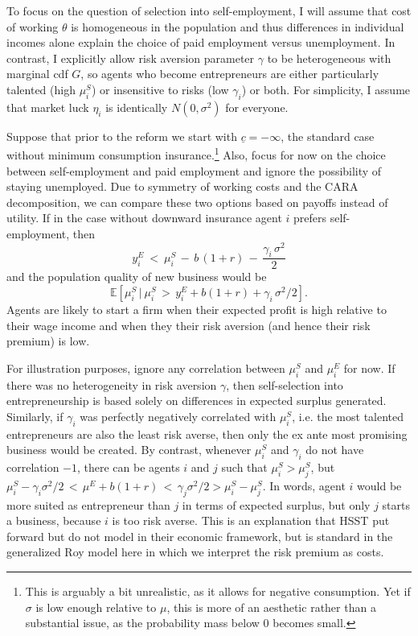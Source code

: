 \noindent To focus on the question of selection into self-employment, I will assume that  cost of working $\theta$ is homogeneous in the population and thus differences in individual incomes alone explain the choice of paid employment versus unemployment. In contrast, I explicitly allow risk aversion parameter $\gamma$ to be heterogeneous with marginal cdf $G$, so agents who become entrepreneurs are either particularly talented (high $\mu_i^S$) or insensitive to risks (low $\gamma_i$) or both. For simplicity, I assume that market luck $\eta_i$ is identically $N(0, \sigma^2)$ for everyone. \newline

\noindent Suppose that prior to the reform we start with $\underline{c} = - \infty$, the standard case without minimum consumption insurance.\footnote{This is arguably a bit unrealistic, as it allows for negative consumption. Yet if $\sigma$ is low enough relative to $\mu$, this is more of an aesthetic rather than a substantial issue, as the probability mass below $0$ becomes small.}
Also, focus for now on the choice between self-employment and paid employment and ignore the possibility of staying unemployed. Due to symmetry of working costs and the CARA decomposition, we can compare these two options based on payoffs instead of utility. If in the case without downward insurance agent $i$ prefers self-employment, then 
\begin{equation}
y^E_i \:  < \:  \mu^S_i \, - \,  b \, (1+r) \, - \, \frac{\gamma_i \, \sigma^2}{2}
\end{equation} 
and the population quality of new business would be 
\begin{equation}
\mathbb{E}\left[\mu_i^S \, | \: \mu_i^S \, > \, y_i^E + b(1+r) + \gamma_i \, \sigma^2 / 2\right].
\end{equation}
Agents are likely to start a firm when their expected profit is high relative to their wage income and when they their risk aversion (and hence their risk premium) is low. 

For illustration purposes, ignore any correlation between $\mu_i^S$ and $\mu_i^E$ for now. If there was no heterogeneity in risk aversion $\gamma$, then self-selection into entrepreneurship is based solely on differences in expected surplus generated. Similarly, if $\gamma_i$ was perfectly negatively correlated with $\mu_i^S$, i.e. the most talented entrepreneurs are also the least risk averse, then only the ex ante most promising business would be created. By contrast, whenever $\mu_i^S$ and $\gamma_i$ do not have correlation $-1$, there can be agents $i$ and $j$ such that $\mu_i^S > \mu_j^S$, but $\mu_i^S - \gamma_i \sigma^2 /2 \, < \, \mu^E + b (1+r) \, < \,  \gamma_j \sigma^2 /2  > \mu_i^S - \mu_j^S$. In words, agent $i$ would be more suited as entrepreneur than $j$ in terms of expected surplus, but only $j$ starts a business, because $i$ is too risk averse. This is an explanation that HSST put forward but do not model in their economic framework, but is standard in the generalized Roy model here in which we interpret the risk premium as costs.


